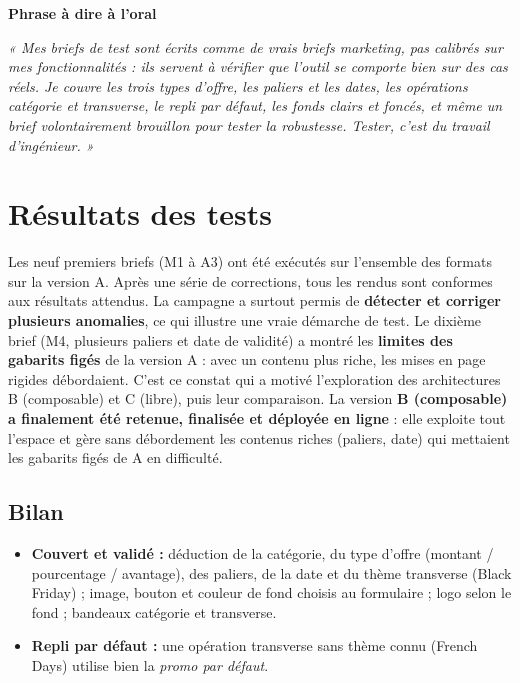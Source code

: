 \documentclass[11pt,a4paper]{article}
\newcommand{\phrasea}[1]{%
  \begin{phrasebox}
  {\bfseries\color{gefblue}\textsf{Phrase à dire à l'oral}}\par\smallskip
  \itshape #1
  \end{phrasebox}%
}
\begin{document}
\phrasea{« Mes briefs de test sont écrits comme de vrais briefs marketing, pas calibrés sur
mes fonctionnalités : ils servent à vérifier que l'outil se comporte bien sur des cas réels.
Je couvre les trois types d'offre, les paliers et les dates, les opérations catégorie et
transverse, le repli par défaut, les fonds clairs et foncés, et même un brief volontairement
brouillon pour tester la robustesse. Tester, c'est du travail d'ingénieur. »}

\section{Résultats des tests}

Les neuf premiers briefs (M1 à A3) ont été exécutés sur l'ensemble des formats sur la
version A. Après une série de corrections, tous les rendus sont conformes aux résultats
attendus. La campagne a surtout permis de \textbf{détecter et corriger plusieurs
anomalies}, ce qui illustre une vraie démarche de test. Le dixième brief (M4, plusieurs
paliers et date de validité) a montré les \textbf{limites des gabarits figés} de la
version A : avec un contenu plus riche, les mises en page rigides débordaient. C'est ce
constat qui a motivé l'exploration des architectures B (composable) et C (libre), puis
leur comparaison. La version \textbf{B (composable) a finalement été retenue, finalisée et
déployée en ligne} : elle exploite tout l'espace et gère sans débordement les contenus
riches (paliers, date) qui mettaient les gabarits figés de A en difficulté.

\subsection{Bilan}
\begin{itemize}[leftmargin=1.4em]
  \item \textbf{Couvert et validé :} déduction de la catégorie, du type d'offre
        (montant / pourcentage / avantage), des paliers, de la date et du thème transverse
        (Black Friday) ; image, bouton et couleur de fond choisis au formulaire ; logo
        selon le fond ; bandeaux catégorie et transverse.
  \item \textbf{Repli par défaut :} une opération transverse sans thème connu
        (French Days) utilise bien la \emph{promo par défaut}.
\end{itemize}
\end{document}
